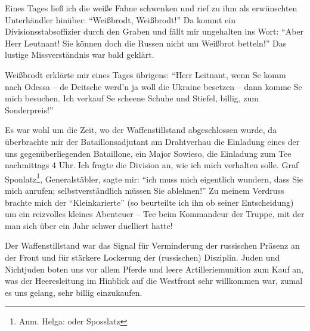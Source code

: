 \documentclass[a5paper,pagesize,10pt,twoside=true]{scrbook}
\begin{document}
Eines Tages ließ ich die weiße Fahne schwenken und rief zu ihm als erwünschten Unterhändler hinüber: \enquote{Weißbrodt, Weißbrodt!} Da kommt ein Divisionsstabsoffizier durch den Graben und fällt mir ungehalten ins Wort: \enquote{Aber Herr Leutnant! Sie können doch die Russen nicht um Weißbrot betteln!} Das lustige Missverständnis war bald geklärt.

Weißbrodt erklärte mir eines Tages übrigens: \enquote{Herr Leitnant, wenn Se komm nach Odessa -- de Deitsche werd'n ja woll die Ukraine besetzen -- dann komme Se mich besuchen. Ich verkauf Se scheene Schuhe und Stiefel, billig, zum Sonderpreis!}

Es war wohl um die Zeit, wo der Waffenstillstand abgeschlossen wurde, da überbrachte mir der Bataillonsadjutant am Drahtverhau die Einladung eines der uns gegenüberliegenden Bataillone, ein Major Sowieso, die Einladung zum Tee nachmittags 4 Uhr. Ich fragte die Division an, wie ich mich verhalten solle. Graf Sponlatz\footnote{Anm. Helga: oder Sposslatz}, Generalstäbler, sagte mir: \enquote{ich muss mich eigentlich wundern, dass Sie mich anrufen; selbstverständlich müssen Sie ablehnen!} Zu meinem Verdruss brachte mich der \enquote{Kleinkarierte} (so beurteilte ich ihn ob seiner Entscheidung) um ein reizvolles kleines Abenteuer -- Tee beim Kommandeur der Truppe, mit der man sich über ein Jahr schwer duelliert hatte!

Der Waffenstillstand war das Signal für Verminderung der russischen Präsenz an der Front und für stärkere Lockerung der (russischen) Disziplin. Juden und Nichtjuden boten uns vor allem Pferde und leere Artilleriemunition zum Kauf an, was der Heeresleitung im Hinblick auf die Westfront sehr willkommen war, zumal es uns gelang, sehr billig einzukaufen.
\end{document}
